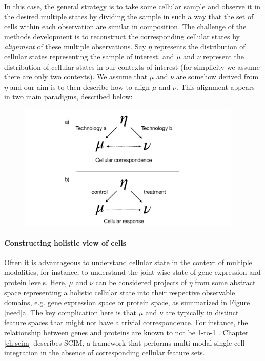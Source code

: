 In this case, the general strategy is to take some cellular sample
and observe it in the desired multiple states
by dividing the sample in such a way that the set of cells within each observation are similar in composition.
The challenge of the methods development is to reconstruct the corresponding cellular states by \emph{alignment} of these multiple observations.
Say $\eta$ represents the distribution of cellular states representing the sample of interest, and $\mu$ and $\nu$ represent the distribution of cellular states in our contexts of interest (for simplicity we assume there are only two contexts).
We assume that $\mu$ and $\nu$ are somehow derived from $\eta$ and our aim is to then describe how to align $\mu$ and $\nu$.
This alignment appears in two main paradigms, described below:

\begin{figure}
  \begin{center}
    \includegraphics[width=0.95\textwidth]{figures/introduction/thesis-overview-pgm.pdf}
  \end{center}
  \caption{}\label{fig:thesis-overview-pgm}
\end{figure}

\paragraph{Constructing holistic view of cells}
Often it is advantageous to understand cellular state in the context of multiple modalities,
for instance, to understand the joint-wise state of gene expression and protein levels.
Here, $\mu$ and $\nu$ can be considered projects of $\eta$ from some abstract space representing a holistic cellular state into their respective observable domains, e.g. gene expression space or protein space, as summarized in Figure \ref{need}a.
The key complication here is that $\mu$ and $\nu$ are typically in distinct feature spaces that might not have a trivial correspondence.
For instance, the relationship between genes and proteins are known to not be 1-to-1 \cite{edfors2016}.
Chapter \ref{ch:scim} describes SCIM, a framework that performs multi-modal single-cell integration in the absence of corresponding cellular feature sets.

